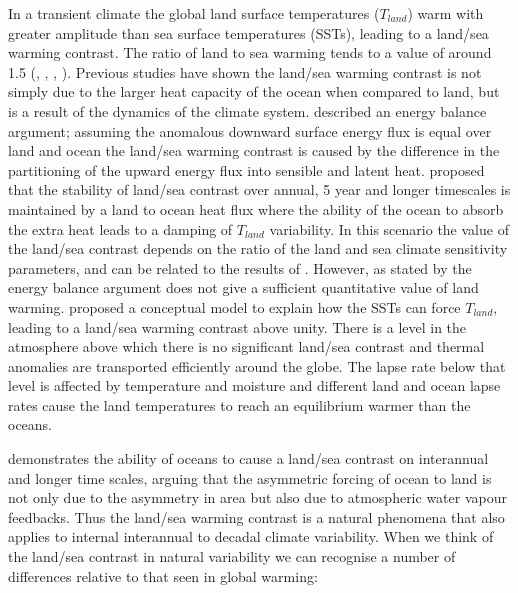 In a transient climate the global land surface temperatures ($T_{land}$) warm 
with greater amplitude than sea surface temperatures (SSTs), leading to a 
land/sea warming contrast.  The ratio of land to sea warming tends to a value of 
around 1.5  (\citealt{Sutton2007}, \citealt{Lambert2007}, \citealt{Compo2008},
\citealt{Dommenget2009}). Previous studies have shown the land/sea warming 
contrast is not simply due to the larger heat capacity of the ocean when 
compared to land, but is a result of the dynamics of the climate system.  
\citet{Sutton2007} described an energy balance argument; assuming the anomalous 
downward surface energy flux is equal over land and ocean the land/sea warming 
contrast is caused by the difference in the partitioning of the upward energy 
flux into sensible and latent heat.  \citet*{Lambert2007} proposed that the 
stability of land/sea contrast over annual, 5 year and longer timescales is 
maintained by a land to ocean heat flux where the ability of the ocean to absorb 
the extra heat leads to a damping of $T_{land}$ variability. In this scenario 
the value of the land/sea contrast depends on the ratio of the land and sea 
climate sensitivity parameters, and can be related to the results of 
\citet{Sutton2007}.  However, as stated by \citet{Byrne2013a} the energy balance 
argument does not give a sufficient quantitative value of land warming.  
\citet{Joshi2008} proposed a conceptual model to explain how the SSTs can force 
$T_{land}$, leading to a land/sea warming contrast above unity.  There is a 
level in the atmosphere above which there is no significant land/sea contrast 
and thermal anomalies are transported efficiently around the globe. The lapse 
rate below that level is affected by temperature and moisture and different land 
and ocean lapse rates cause the land temperatures to reach an equilibrium warmer 
than the oceans.  

\citet{Dommenget2009} demonstrates the ability of oceans to cause a land/sea 
contrast on interannual and longer time scales, arguing that the asymmetric 
forcing of ocean to land is not only due to the asymmetry in area but also due 
to atmospheric water vapour feedbacks. Thus the land/sea warming contrast is a 
natural phenomena that also applies to internal interannual to decadal climate 
variability. When we think of the land/sea contrast in natural variability we 
can recognise a number of differences relative to that seen in global warming: 

